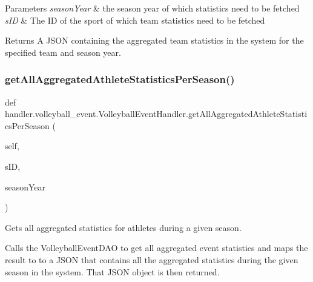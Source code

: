 \begin{DoxyParams}{Parameters}
{\em season\+Year} & the season year of which statistics need to be fetched \\
\hline
{\em s\+ID} & The ID of the sport of which team statistics need to be fetched\\
\hline
\end{DoxyParams}
\begin{DoxyReturn}{Returns}
A J\+S\+ON containing the aggregated team statistics in the system for the specified team and season year. 
\end{DoxyReturn}
\mbox{\label{classhandler_1_1volleyball__event_1_1_volleyball_event_handler_a2ea2936805e7bc39b69f731cf615efe6}} 
\subsubsection{\texorpdfstring{get\+All\+Aggregated\+Athlete\+Statistics\+Per\+Season()}{getAllAggregatedAthleteStatisticsPerSeason()}}
{\footnotesize\ttfamily def handler.\+volleyball\+\_\+event.\+Volleyball\+Event\+Handler.\+get\+All\+Aggregated\+Athlete\+Statistics\+Per\+Season (\begin{DoxyParamCaption}\item[{}]{self,  }\item[{}]{s\+ID,  }\item[{}]{season\+Year }\end{DoxyParamCaption})}



Gets all aggregated statistics for athletes during a given season. 

Calls the Volleyball\+Event\+D\+AO to get all aggregated event statistics and maps the result to to a J\+S\+ON that contains all the aggregated statistics during the given season in the system. That J\+S\+ON object is then returned.


